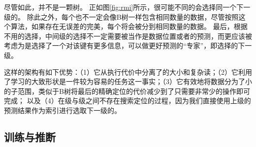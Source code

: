尽管如此，{\rmi}并不是一颗树。
正如图\ref{fig:rmi}所示，很可能不同的{\model}会选择同一个下一级的{\model}。
除此之外，每个{\model}也不一定会像B树一样包含相同数量的数据，尽管按照这个算法，如果存在无误差的完美{\model}，每个{\model}将会被分到相同数量的数据。
最后，根据不用的{\model}选择，中间级的选择不一定需要被当作是数据位置或者{\cdf}的预测，而更应该被考虑为是选择了一个对该键有更多信息，可以做更好预测的``专家''，即选择的下一级{\model}。


这样的架构有如下优势：（1）它从执行代价中分离了{\model}的大小和复杂读；（2）它利用了学习{\cdf}的大致形状是一件较为容易的任务这一事实；（3）它有效地将数据分为了小的子范围，类似于B树将最后的精确定位的代价减少到了只需要非常少的操作即可完成；
以及（4）在级与级之间不存在搜索定位的过程，因为我们直接使用上级{\model}的预测结果作为索引进行选取下一级的{\model}。


\subsection{{\rmi}训练与推断}
\label{sec:rmi-train-inference}


